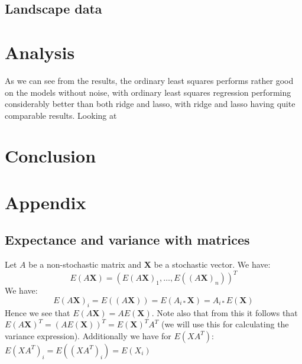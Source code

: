 \documentclass{article}
\begin{document}
\subsection{Landscape data}


\section{Analysis}
As we can see from the results, the ordinary least squares performs rather good
on the models without noise, with ordinary least squares regression performing
considerably better than both ridge and lasso, with ridge and lasso having quite
comparable results. Looking at

\section{Conclusion}

\section{Appendix}

\subsection{Expectance and variance with matrices}
Let $A$ be a non-stochastic matrix and $\mathbf{X}$ be a stochastic vector. We have:
$$E(A \mathbf{X}) = (E(A \mathbf{X})_1, \dots, E((A \mathbf{X})_n))^T$$
We have:
$$E(A \mathbf{X})_i = E((A \mathbf{X})) = E(A_{i *} \mathbf{X}) = A_{i *} E(\mathbf{X})$$
Hence we see that $E(A \mathbf{X}) = A E(\mathbf{X})$.
Note also that from this it follows that $E(A \mathbf{X})^T = (A
    E(\mathbf{X}))^T = E(\mathbf{X})^T A^T$ (we will use this for calculating the
variance expression).
Additionally we have for $E(X A^T)$:
$E(X A^T)_i = E((X A^T)_i) = E(X_i )$
\end{document}
